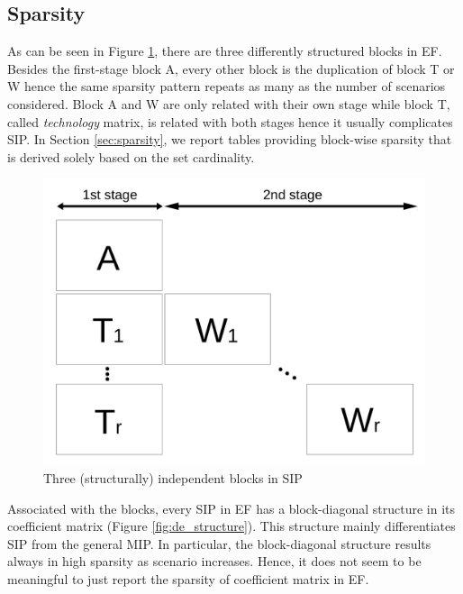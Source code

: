 \subsection{Sparsity} \label{subsec:sparsity}
As can be seen in Figure \ref{fig:stagewise_sparsity}, there are three differently structured blocks in EF. Besides the first-stage block A, every other block is the duplication of block T or W hence the same sparsity pattern repeats as many as the number of scenarios considered. Block A and W are only related with their own stage while block T, called \textit{technology} matrix, is related with both stages hence it usually complicates SIP. In Section \ref{sec:sparsity}, we report tables providing block-wise sparsity that is derived solely based on the set cardinality.
\begin{figure}[H]
	\centering
	\includegraphics[width=0.5\linewidth]{drawings/stagewise_sparsity}
	\caption{Three (structurally) independent blocks in SIP}
	\label{fig:stagewise_sparsity}
\end{figure}
Associated with the blocks, every SIP in EF has a block-diagonal structure in its coefficient matrix (Figure \ref{fig:de_structure}). This structure mainly differentiates SIP from the general MIP. In particular, the block-diagonal structure results always in high sparsity as scenario increases. Hence, it does not seem to be meaningful to just report the sparsity of coefficient matrix in EF.
